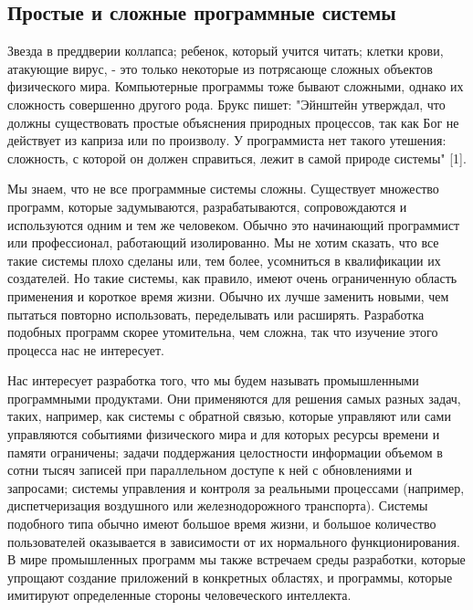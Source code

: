 \documentclass[a4paper,12pt]{article}
\begin{document}
\subsection{Простые и сложные программные системы}
\begin{small}

\parindent=1.25cm
\hspace{1.25 cm}
Звезда в преддверии коллапса; ребенок, который учится читать; клетки крови, атакующие вирус, - это только некоторые из потрясающе сложных объектов физического мира. Компьютерные программы тоже бывают сложными, однако их сложность совершенно другого рода. Брукс пишет: "Эйнштейн утверждал, что должны существовать простые объяснения природных процессов, так как Бог не действует из каприза или по произволу. У программиста нет такого утешения: сложность, с которой он должен справиться, лежит в самой природе системы" [1]. \par 
\medskip
Мы знаем, что не все программные системы сложны. Существует множество программ, которые задумываются, разрабатываются, сопровождаются и используются одним и тем же человеком. Обычно это начинающий программист или профессионал, работающий изолированно. Мы не хотим сказать, что все такие системы плохо сделаны или, тем более, усомниться в квалификации их создателей. Но такие системы, как правило, имеют очень ограниченную область применения и короткое время жизни. Обычно их лучше заменить новыми, чем пытаться повторно использовать, переделывать или расширять. Разработка подобных программ скорее утомительна, чем сложна, так что изучение этого процесса нас не интересует. \par \medskip
Нас интересует разработка того, что мы будем называть промышленными программными продуктами. Они применяются для решения самых разных задач, таких, например, как системы с обратной связью, которые управляют или сами управляются событиями физического мира и для которых ресурсы времени и памяти ограничены; задачи поддержания целостности информации объемом в сотни тысяч записей при параллельном доступе к ней с обновлениями и запросами; системы управления и контроля за реальными процессами (например, диспетчеризация воздушного или железнодорожного транспорта). Системы подобного типа обычно имеют большое время жизни, и большое количество пользователей оказывается в зависимости от их нормального функционирования. В мире промышленных программ мы также встречаем среды разработки, которые упрощают создание приложений в конкретных областях, и программы, которые имитируют определенные стороны человеческого интеллекта. \par \medskip

\end{small}
\end{document}
